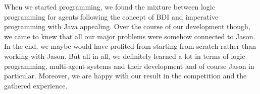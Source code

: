 When we started programming, we found the mixture between logic programming for agents following the concept of BDI and imperative programming with Java appealing.
Over the course of our development though, we came to knew that all our major problems were somehow connected to Jason.
In the end, we maybe would have profited from starting from scratch rather than working with Jason.
But all in all, we definitely learned a lot in terms of logic programming, multi-agent systems and their development and of course Jason in particular.
Moreover, we are happy with our result in the competition and the gathered experience.
